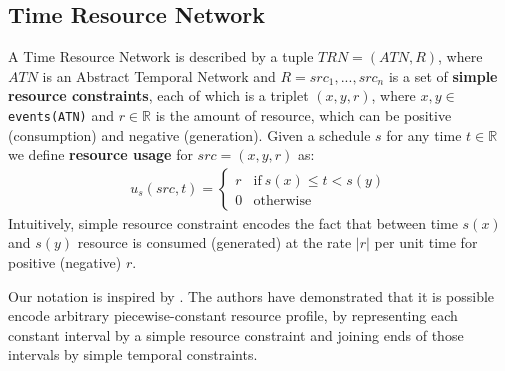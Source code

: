 

\subsection{Time Resource Network}
\label{sec:trn_definition}
A Time Resource Network is described by a tuple $TRN = (ATN, R)$, where $ATN$ is an Abstract Temporal Network and $R={src_1, ..., src_n}$ is a set of \textbf{simple resource constraints}, each of which is a triplet $(x, y, r)$, where $x, y \in$ \texttt{events(ATN)} and $r \in \mathbb{R}$ is the amount of resource, which can be positive (consumption) and negative (generation). Given a schedule $s$ for any time $t \in \mathbb{R}$ we define \textbf{resource usage} for $src=(x,y,r)$ as:
\begin{align*}
u_s(src, t) = \begin{cases}
r & \text{if}\ s(x) \leq t < s(y)\\
0 & \text{otherwise}
\end{cases}
\end{align*}
Intuitively, simple resource constraint encodes the fact that between time $s(x)$ and $s(y)$  resource is consumed (generated) at the rate $|r|$ per unit time for positive (negative) $r$.

Our notation is inspired by \cite{bartusch1988scheduling}. The authors have demonstrated that it is possible encode arbitrary piecewise-constant resource profile, by representing each constant interval by a simple resource constraint and joining ends of those intervals by simple temporal constraints.


